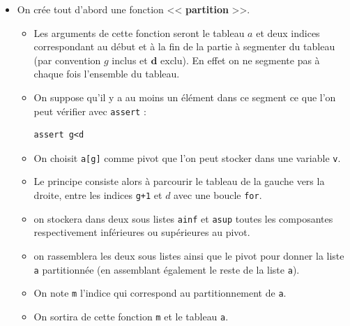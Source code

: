 \begin{itemize}
\item On crée tout d'abord une fonction << \textbf{partition} >>. 
\begin{itemize}
\item Les arguments de cette fonction seront le tableau \textbf{$a$} et deux indices correspondant au début et à la fin de la partie à segmenter du tableau (par convention \textbf{$g$} inclus et $\textbf{d}$ exclu). En effet on ne segmente pas à chaque fois l'ensemble du tableau.
\item On suppose qu'il y a au moins un élément dans ce segment ce que l'on peut vérifier avec \texttt{assert} : 


	\begin{DDbox}{\linewidth}
		\begin{verbatim}
assert g<d
		\end{verbatim}
	\end{DDbox}
\item On choisit \texttt{a[g]} comme pivot que l'on peut stocker dans une variable \texttt{v}.
\item Le principe consiste alors à parcourir le tableau de la gauche vers la droite, entre les indices \texttt{g+1} et \textbf{$d$} avec une boucle \texttt{for}.
\item on stockera dans deux sous listes \texttt{ainf} et \texttt{asup} toutes les composantes respectivement inférieures ou supérieures au pivot.
\item on rassemblera les deux sous listes ainsi que le pivot pour donner la liste \texttt{a} partitionnée (en assemblant également le reste de la liste \texttt{a}).
\item On note \texttt{m} l'indice qui correspond au partitionnement de \texttt{a}.
\item On sortira de cette fonction \texttt{m} et le tableau \texttt{a}.
\end{itemize}
\end{itemize}


